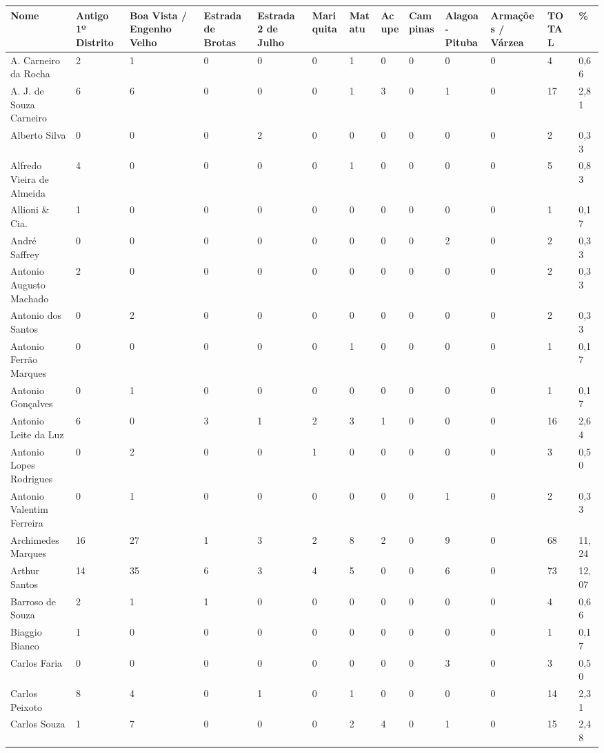 \begin{table}[!htp]
{
\begin{tabular}{lllllllllllll}
\toprule
Nome	&Antigo 1º Distrito	&Boa Vista / Engenho Velho	&Estrada de Brotas	&Estrada 2 de Julho	&Mariquita	&Matatu	&Acupe	&Campinas	&Alagoa-Pituba	&Armações / Várzea	&TOTAL	&\%\\
\midrule
\midrule
A. Carneiro da Rocha	&2	&1	&0	&0	&0	&1	&0	&0	&0	&0	&4	&0,66\\
A. J. de Souza Carneiro	&6	&6	&0	&0	&0	&1	&3	&0	&1	&0	&17	&2,81\\
Alberto Silva	&0	&0	&0	&2	&0	&0	&0	&0	&0	&0	&2	&0,33\\
Alfredo Vieira de Almeida	&4	&0	&0	&0	&0	&1	&0	&0	&0	&0	&5	&0,83\\
Allioni \& Cia.	&1	&0	&0	&0	&0	&0	&0	&0	&0	&0	&1	&0,17\\
André Saffrey	&0	&0	&0	&0	&0	&0	&0	&0	&2	&0	&2	&0,33\\
Antonio Augusto Machado	&2	&0	&0	&0	&0	&0	&0	&0	&0	&0	&2	&0,33\\
Antonio dos Santos	&0	&2	&0	&0	&0	&0	&0	&0	&0	&0	&2	&0,33\\
Antonio Ferrão Marques	&0	&0	&0	&0	&0	&1	&0	&0	&0	&0	&1	&0,17\\
Antonio Gonçalves	&0	&1	&0	&0	&0	&0	&0	&0	&0	&0	&1	&0,17\\
Antonio Leite da Luz	&6	&0	&3	&1	&2	&3	&1	&0	&0	&0	&16	&2,64\\
Antonio Lopes Rodrigues	&0	&2	&0	&0	&1	&0	&0	&0	&0	&0	&3	&0,50\\
Antonio Valentim Ferreira	&0	&1	&0	&0	&0	&0	&0	&0	&1	&0	&2	&0,33\\
Archimedes Marques	&16	&27	&1	&3	&2	&8	&2	&0	&9	&0	&68	&11,24\\
Arthur Santos	&14	&35	&6	&3	&4	&5	&0	&0	&6	&0	&73	&12,07\\
Barroso de Souza	&2	&1	&1	&0	&0	&0	&0	&0	&0	&0	&4	&0,66\\
Biaggio Bianco	&1	&0	&0	&0	&0	&0	&0	&0	&0	&0	&1	&0,17\\
Carlos Faria	&0	&0	&0	&0	&0	&0	&0	&0	&3	&0	&3	&0,50\\
Carlos Peixoto	&8	&4	&0	&1	&0	&1	&0	&0	&0	&0	&14	&2,31\\
Carlos Souza	&1	&7	&0	&0	&0	&2	&4	&0	&1	&0	&15	&2,48\\

\end{tabular}}
\end{table}
